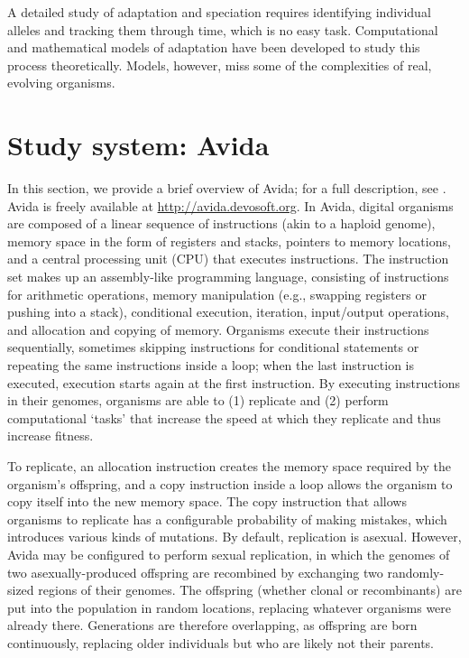 \begin{doublespace}
A detailed study of adaptation and speciation
requires identifying individual alleles
and tracking them through time, which is no easy task.
%
Computational and mathematical models of adaptation
have been developed to study this process theoretically.
%
Models, however, miss some of the complexities of real, evolving organisms.
%
%

\section*{Study system: Avida}
\label{sec:avida}

In this section, we provide a brief overview of Avida;
for a full description, see \cite{ofr04}.
%
Avida is freely available at \url{http://avida.devosoft.org}.
%
In Avida, digital organisms are composed of
a linear sequence of instructions (akin to a haploid genome),
memory space in the form of registers and stacks,
pointers to memory locations,
and a central processing unit (CPU) that executes instructions.
%
The instruction set makes up an assembly-like programming language,
consisting of instructions for arithmetic operations,
memory manipulation (e.g., swapping registers or pushing into a stack),
conditional execution, iteration, input/output operations,
and allocation and copying of memory.
%
Organisms execute their instructions sequentially,
sometimes skipping instructions for conditional statements
or repeating the same instructions inside a loop;
when the last instruction is executed,
execution starts again at the first instruction.
%
By executing instructions in their genomes,
organisms are able to (1) replicate and (2) perform computational `tasks'
that increase the speed at which they replicate and thus increase fitness.



To replicate, an allocation instruction creates the memory space
required by the organism's offspring, and a copy instruction inside a loop
allows the organism to copy itself into the new memory space.
%
The copy instruction that allows organisms to replicate
has a configurable probability of making mistakes,
which introduces various kinds of mutations.
%
By default, replication is asexual.
%
However, Avida may be configured to perform sexual replication,
in which the genomes of two asexually-produced offspring are recombined
by exchanging two randomly-sized regions of their genomes.
%
The offspring (whether clonal or recombinants) are put into the population
in random locations, replacing whatever organisms were already there.
%
Generations are therefore overlapping, as offspring are born continuously,
replacing older individuals but who are likely not their parents.




\end{doublespace}
